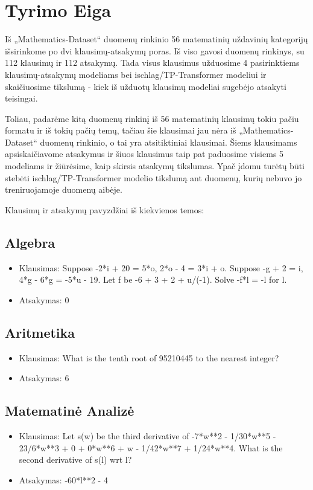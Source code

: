 \documentclass[conference]{IEEEtran}
\begin{document}
\section{Tyrimo Eiga}
Iš „Mathematics-Dataset“ duomenų rinkinio 56 matematinių uždavinių kategorijų išsirinkome
po dvi klausimų-atsakymų poras. \cite{dataset} Iš viso gavosi duomenų rinkinys, su 112 klausimų ir 112 atsakymų.
Tada visus klausimus užduosime 4 pasirinktiems klausimų-atsakymų modeliams bei ischlag/TP-Transformer \cite{tptransformer} modeliui ir skaičiuosime
tikslumą - kiek iš užduotų klausimų modeliai sugebėjo atsakyti teisingai. \par
Toliau, padarėme kitą duomenų rinkinį iš 56 matematinių klausimų tokiu pačiu formatu ir iš tokių pačių temų,
tačiau šie klausimai jau nėra iš „Mathematics-Dataset“ duomenų rinkinio, o tai yra
atsitiktiniai klausimai. Šiems klausimams apsiskaičiavome atsakymus ir šiuos klausimus taip pat paduosime
visiems 5 modeliams ir žiūrėsime, kaip skirsis atsakymų tikslumas. Ypač įdomu turėtų būti stebėti
ischlag/TP-Transformer modelio tikslumą ant duomenų, kurių nebuvo jo treniruojamoje duomenų aibėje. \par
Klausimų ir atsakymų pavyzdžiai iš kiekvienos temos:
\subsection{Algebra}
\begin{itemize}
    \item Klausimas: Suppose -2*i + 20 = 5*o, 2*o - 4 = 3*i + o. Suppose -g + 2 = i, 4*g - 6*g = -5*u - 19. Let f be -6 + 3 + 2 + u/(-1). Solve -f*l = -l for l.
    \item Atsakymas: 0
\end{itemize}
\subsection{Aritmetika}
\begin{itemize}
    \item Klausimas: What is the tenth root of 95210445 to the nearest integer?
    \item Atsakymas: 6
\end{itemize}
\subsection{Matematinė Analizė}
\begin{itemize}
    \item Klausimas: Let s(w) be the third derivative of -7*w**2 - 1/30*w**5 - 23/6*w**3 + 0 + 0*w**6 + w - 1/42*w**7 + 1/24*w**4. What is the second derivative of s(l) wrt l?
    \item Atsakymas: -60*l**2 - 4
\end{itemize}
\end{document}
